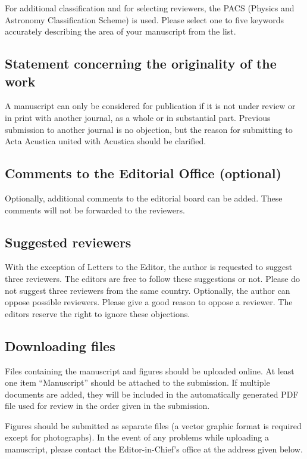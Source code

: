 \documentclass[twocolumn]{article}
\begin{document}
For additional classification and for selecting reviewers, the PACS
(Physics and Astronomy Classification Scheme) is used. Please select one
to five keywords accurately describing the area of your manuscript from
the list.

\subsection{Statement concerning the originality of the work}

A manuscript can only be considered for publication if it is not under
review or in print with another journal, as a whole or in substantial
part. Previous submission to another journal is no objection, but the
reason for submitting to Acta Acustica united with Acustica should be
clarified.

\subsection{Comments to the Editorial Office (optional)}

Optionally, additional comments to the editorial board can be added.
These comments will not be forwarded to the reviewers.

\subsection{Suggested reviewers}

With the exception of Letters to the Editor, the author is requested to
suggest three reviewers. The editors are free to follow these
suggestions or not. Please do not suggest three reviewers from the same
country. Optionally, the author can oppose possible reviewers. Please
give a good reason to oppose a reviewer. The editors reserve the right
to ignore these objections.

\subsection{Downloading files} \label{Manuscript files and figures}

Files containing the manuscript and figures should be uploaded online.
At least one item ``Manuscript'' should be attached to the submission.
If multiple documents are added, they will be included in the
automatically generated PDF file used for review in the order given in
the submission.

Figures should be submitted as separate files (a vector graphic format
is required except for photographs). In the event of any problems while
uploading a manuscript, please contact the Editor-in-Chief's office at
the address given below.
\end{document}
